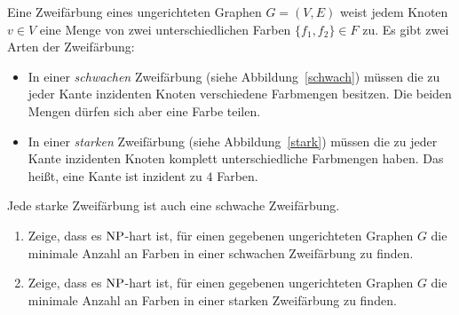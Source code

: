 \documentclass{uebung_cs}
\begin{document}
\begin{aufgabe}[Zweifärbung]
	Eine Zweifärbung eines ungerichteten Graphen $G = (V,E)$ weist jedem Knoten $v \in V$ eine Menge von zwei unterschiedlichen Farben $\{f_1,f_2\} \in F$ zu. Es gibt zwei Arten der Zweifärbung:
	\begin{itemize}
		\item In einer \textit{schwachen} Zweifärbung (siehe Abbildung~\ref{schwach}) müssen die zu jeder Kante inzidenten Knoten verschiedene Farbmengen besitzen. Die beiden Mengen dürfen sich aber eine Farbe teilen.
		\item In einer \textit{starken} Zweifärbung (siehe Abbildung~\ref{stark}) müssen die zu jeder Kante inzidenten Knoten komplett unterschiedliche Farbmengen haben. Das heißt, eine Kante ist inzident zu $4$ Farben.
	\end{itemize}
	Jede starke Zweifärbung ist auch eine schwache Zweifärbung.
	\begin{enumerate}
		\item Zeige, dass es $\mathrm{NP}$-hart ist, für einen gegebenen ungerichteten Graphen $G$ die minimale Anzahl an Farben in einer schwachen Zweifärbung zu finden.
		\item Zeige, dass es $\mathrm{NP}$-hart ist, für einen gegebenen ungerichteten Graphen $G$ die minimale Anzahl an Farben in einer starken Zweifärbung zu finden.
	\end{enumerate}
	\begin{figure}[ht]
	    \begin{minipage}{0.5\linewidth}
	        \centering
\end{minipage}
\end{figure}
\end{aufgabe}
\end{document}
